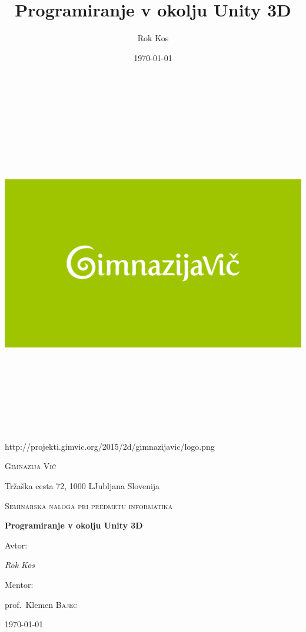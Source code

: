 \documentclass[a4paper,oneside,12pt]{article} %
\title{Programiranje v okolju Unity 3D}
\author{Rok Kos}
\date{\today}
\begin{document}
	
	\begin{titlepage}
		\centering
		\includegraphics[width=15cm, height=15cm,keepaspectratio=true]{Logo.png}\par
		{\tiny http://projekti.gimvic.org/2015/2d/gimnazijavic/logo.png} \par\vspace{1cm}
		{\scshape\LARGE Gimnazija Vič \par}
		Tržaška cesta 72, 1000 LJubljana Slovenija \par
		\vspace{1cm}
		{\scshape\Large Seminarska naloga pri predmetu informatika\par}
		\vspace{1.5cm}
		{\huge\bfseries Programiranje v okolju Unity 3D\par}
		\vspace{2cm}
		Avtor: \par
		{\Large\itshape Rok Kos \par}
		\vfill
		Mentor:\par
		prof.~Klemen \textsc{Bajec}

		\vfill

		{\large \today\par}
	\end{titlepage}
\end{document}
